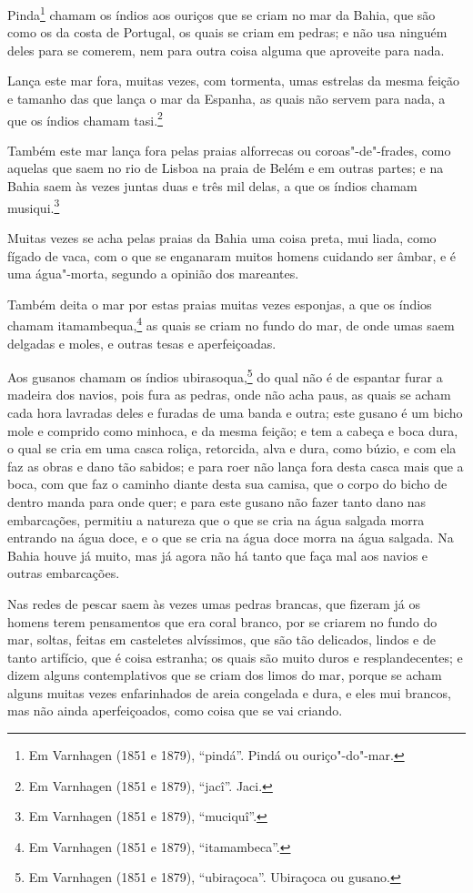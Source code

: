 \begin{linenumbers}
Pinda\footnote{ Em Varnhagen (1851 e 1879), ``pindá''. Pindá ou ouriço"-do"-mar.} chamam os
índios aos ouriços que se criam no mar da Bahia, que são como os da costa de Portugal, os
quais se criam em pedras; e não usa ninguém deles para se comerem, nem para outra coisa
alguma que aproveite para nada.

Lança este mar fora, muitas vezes, com tormenta, umas estrelas da mesma feição e tamanho
das que lança o mar da Espanha, as quais não servem para nada, a que os índios chamam
tasi.\footnote{ Em Varnhagen (1851 e 1879), ``jacî''. Jaci.}

Também este mar lança fora pelas praias alforrecas ou coroas"-de"-frades, como aquelas que
saem no rio de Lisboa na praia de Belém e em outras partes; e na Bahia saem às vezes
juntas duas e três mil delas, a que os índios chamam musiqui.\footnote{ Em Varnhagen (1851
e 1879), ``muciquî''.}

Muitas vezes se acha pelas praias da Bahia uma coisa preta, mui liada, como fígado de
vaca, com o que se enganaram muitos homens cuidando ser âmbar, e é uma água"-morta, segundo
a opinião dos mareantes.

Também deita o mar por estas praias muitas vezes esponjas, a que os índios chamam
itamambequa,\footnote{ Em Varnhagen (1851 e 1879), ``itamambeca''.} as quais se criam no
fundo do mar, de onde umas saem delgadas e moles, e outras tesas e aperfeiçoadas.

Aos gusanos chamam os índios ubirasoqua,\footnote{ Em Varnhagen (1851 e 1879),
``ubiraçoca''. Ubiraçoca ou gusano.} do qual não é de espantar furar a madeira dos
navios, pois fura as pedras, onde não acha paus, as quais se acham cada hora lavradas
deles e furadas de uma banda e outra; este gusano é um bicho mole e comprido como minhoca,
e da mesma feição; e tem a cabeça e boca dura, o qual se cria em uma casca roliça,
retorcida, alva e dura, como búzio, e com ela faz as obras e dano tão sabidos; e para roer
não lança fora desta casca mais que a boca, com que faz o caminho diante desta sua camisa,
que o corpo do bicho de dentro manda para onde quer; e para este gusano não fazer tanto
dano nas embarcações, permitiu a natureza que o que se cria na água salgada morra entrando
na água doce, e o que se cria na água doce morra na água salgada. Na Bahia houve já muito,
mas já agora não há tanto que faça mal aos navios e outras embarcações.

Nas redes de pescar saem às vezes umas pedras brancas, que fizeram já os homens terem
pensamentos que era coral branco, por se criarem no fundo do mar, soltas, feitas em
casteletes alvíssimos, que são tão delicados, lindos e de tanto artifício, que é coisa
estranha; os quais são muito duros e resplandecentes; e dizem alguns contemplativos que se
criam dos limos do mar, porque se acham alguns muitas vezes enfarinhados de areia
congelada e dura, e eles mui brancos, mas não ainda aperfeiçoados, como coisa que se vai
criando.


\end{linenumbers}
